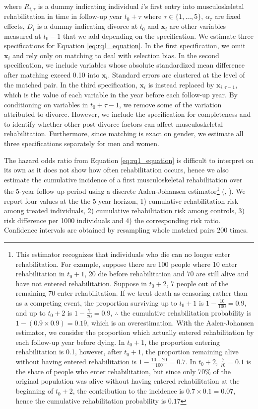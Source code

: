\documentclass[a4paper,12pt]{article}
\theoremstyle{plain}
\theoremstyle{definition}
\theoremstyle{TheoremNum}
\theoremstyle{CorollaryNum}
\theoremstyle{PropositionNum}
\theoremstyle{TheoremNum}
\begin{document}
where $R_{i,\tau}$ is a dummy indicating individual $i$'s first entry into musculoskeletal rehabilitation in time in follow-up year $t_0 + \tau$ where $\tau \in \{1,...,5\}$, $\alpha_\tau$ are fixed effects, $D_i$ is a dummy indicating divorce at $t_0$ and $\mathbf{x}_i$ are other variables measured at $t_0 -1$ that we add depending on the specification. We estimate three specifications for Equation \ref{eq:rq1_equation}. In the first specification, we omit $\mathbf{x}_i$ and rely only on matching to deal with selection bias. In the second specification, we include variables whose absolute standardized mean difference after matching exceed 0.10 into $\mathbf{x}_i$. Standard errors are clustered at the level of the matched pair. In the third specification, $\mathbf{x}_i$ is instead replaced by $\mathbf{x}_{i,\tau-1}$, which is the value of each variable in the year before each follow-up year. By conditioning on variables in $t_0 + \tau - 1$, we remove some of the variation attributed to divorce. However, we include the specification for completeness and to identify whether other post-divorce factors can affect musculoskeletal rehabilitation. Furthermore, since matching is exact on gender, we estimate all three specifications separately for men and women. 

The hazard odds ratio from Equation \ref{eq:rq1_equation} is difficult to interpret on its own as it does not show how often rehabilitation occurs, hence we also estimate the cumulative incidence of a first musculoskeletal rehabilitation over the 5-year follow up period using a discrete Aalen-Johansen estimator\footnote{This estimator recognizes that individuals who die can no longer enter rehabilitation. For example, suppose there are 100 people where 10 enter rehabilitation in $t_0 + 1$, 20 die before rehabilitation and 70 are still alive and have not entered rehabilitation. Suppose in $t_0 + 2$, 7 people out of the remaining 70 enter rehabilitation. If we treat death as censoring rather than as a competing event, the proportion surviving up to $t_0+1$ is $1-\frac{10}{100} = 0.9$, and up to $t_0+2$ is $1-\frac{7}{70} = 0.9$, $\therefore$ the cumulative rehabilitation probability is $1-(0.9\times 0.9) = 0.19$, which is an overestimation. With the Aalen-Johansen estimator, we consider the proportion which actually entered rehabilitation by each follow-up year before dying. In $t_0+1$, the proportion entering rehabilitation is 0.1, however, after $t_0+1$, the proportion remaining alive without having entered rehabilitation is $1-\frac{10+20}{100} = 0.7$. In $t_0+2$, $\frac{7}{70}=0.1$ is the share of people who enter rehabilitation, but since only 70\% of the original population was alive without having entered rehabilitation at the beginning of $t_0+2$, the contribution to the incidence is $0.7\times0.1=0.07$, hence the cumulative rehabilitation probability is $0.17$} (\citeauthor{aalen1978empirical}, \citeyear{aalen1978empirical}). We report four values at the the 5-year horizon, 1) cumulative rehabilitation risk among treated individuals, 2) cumulative rehabilitation risk among controls, 3) risk difference per 1000 individuals and 4) the corresponding risk ratio. Confidence intervals are obtained by resampling whole matched pairs 200 times.
\end{document}
